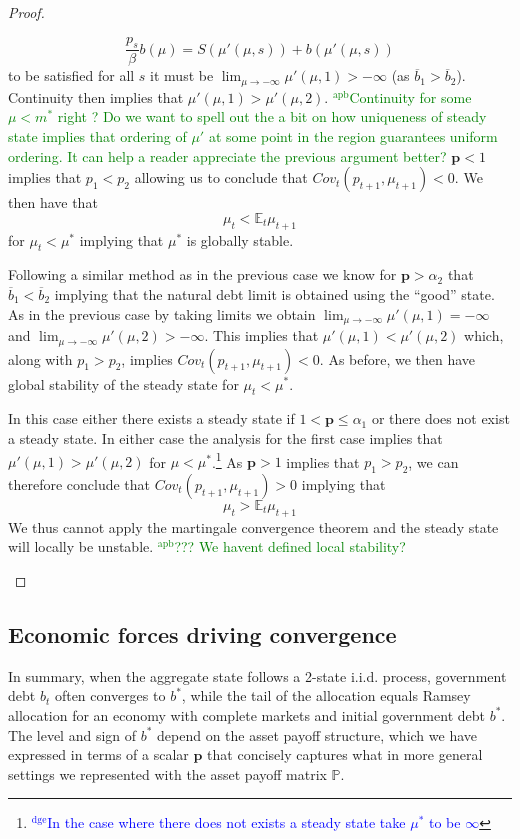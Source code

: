 \documentclass[12pt]{article}
\newcommand{\dge}[1]{\textcolor{blue}{$^{\textrm{dge}}${#1}}}
\newcommand{\apb}[1]{\textcolor{green}{$^{\textrm{apb}}${#1}}}
\newcommand{\EE}{\mathbb E}
\begin{document}
\begin{proof}
{\begin{description}
	\[
		\frac{p_s}{\beta}b(\mu) = S(\mu'(\mu,s))+b(\mu'(\mu,s))
	\]to be satisfied for all $s$ it must be $\lim_{\mu\rightarrow -\infty} \mu'(\mu,1) >-\infty$ (as $\overline b_1 > \overline b_2$).  Continuity then implies that $\mu'(\mu,1) > \mu'(\mu,2)$.  \apb{Continuity for some $\mu<m^*$ right ? Do we want to spell out the a bit on how uniqueness of steady state implies that ordering of $\mu'$ at some point in the region guarantees uniform ordering. It can help a reader appreciate the previous argument better? } 
	$\bm p < 1$ implies that $p_1 < p_2$ allowing us to conclude that $Cov_t(p_{t+1},\mu_{t+1}) < 0$.  We then have that 
	\[
		\mu_t < \EE_t\mu_{t+1}
	\] for $\mu_t < \mu^*$ implying that $\mu^*$ is globally stable.
	\item[2. $\bm p \geq \alpha_2$:]  Following a similar method as in the previous case we know for $\bm p > \alpha_2$ that $\overline b_1 < \overline b_2$ implying that the natural debt limit is obtained using the ``good'' state.  As in the previous case by taking limits we obtain $\lim_{\mu\rightarrow-\infty} \mu'(\mu,1) = -\infty$ and $\lim_{\mu\rightarrow-\infty}\mu'(\mu,2) > -\infty$.  This implies that $\mu'(\mu,1) < \mu'(\mu,2)$ which, along with $p_1 > p_2$, implies $Cov_t(p_{t+1},\mu_{t+1}) <0$.  As before, we then have global stability of the steady state for $\mu_t < \mu^*$.
	\item[3. $\min(\alpha_1,1) < \bm p < \alpha_2$:]   In this case either there exists a steady state if $1 < \bm p \leq \alpha_1$ or there does not exist a steady state.  In either case the analysis for the first case implies that $\mu'(\mu,1) > \mu'(\mu,2)$ for $\mu < \mu ^*$.\footnote{\dge{In the case where there does not exists a steady state take $\mu^*$ to be $\infty$}}  As $\bm p >1$ implies that $p_1 > p_2$, we can therefore conclude that $Cov_t(p_{t+1},\mu_{t+1}) > 0$ implying that 
	\[
		\mu_t > \EE_t \mu_{t+1}
	\]We thus cannot apply the martingale convergence theorem and the steady state will locally be unstable. \apb{??? We havent defined local stability? }
\end{description} }
\end{proof}




\subsection{Economic forces driving convergence}
In summary, when the aggregate state follows a 2-state i.i.d. process, government debt  $b_t$ often converges to $b^*$, while
the tail of the allocation equals  Ramsey allocation for an economy with complete markets and initial government  debt $b^*$.
  The level  and sign of $b^*$ depend on the asset payoff structure, which we have  expressed in terms of a  scalar
  $\bm{p}$ that concisely captures what in more general settings we represented with the asset payoff matrix $\mathbb{P}$.
\end{document}
